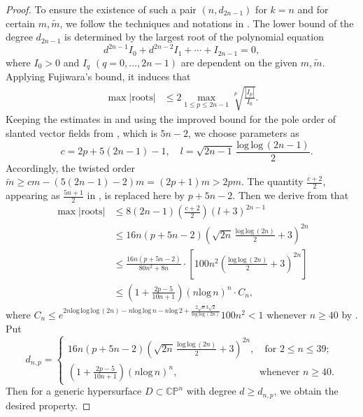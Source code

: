 \documentclass[english, 12pt]{amsart}
\def\log{\mathrm{log}\,}
\theoremstyle{plain}
\theoremstyle{remark}
\numberwithin{equation}{section}
\theoremstyle{plain}
\theoremstyle{named}
\begin{document}
\begin{proof}
	To ensure the existence of such a pair $(n, d_{2n-1})$ for $k=n$ and for certain $m,\widetilde{m}$, we follow the techniques and notations in \cite[Proposition 3.1 and pp. 43]{Merker-Ta22}. The lower bound of the degree $d_{2n-1}$ is determined by the largest root of the polynomial equation 
\[
	d^{2n-1}I_0+ d^{2n-2}I_1+\cdots+I_{2n-1}=0,
\]
where $I_0>0$ and $I_q$ $(q=0,\ldots,2n-1)$ are dependent on the given $m,\widetilde{m}$. Applying Fujiwara's bound, it induces that
	\begin{align*}
		\max|\text{roots}|&\leq  2\max\limits_{1\leq p\leq 2n-1}\sqrt[p]{\frac{|I_p|}{I_0}}.
	\end{align*}
	Keeping the estimates in \cite[pp. 12]{Merker-Ta22} and using the improved bound for the pole order of slanted vector fields from \cite{Darondeau_vectorfield}, which is \( 5n-2 \), we choose parameters as
	\[
	\quad c = 2p + 5(2n-1) - 1, \quad l = \sqrt{2n-1}\, \frac{\log\log(2n-1)}{2}.
	\]
	Accordingly, the twisted order $\widetilde{m}\geq cm-(5(2n-1)-2)m=\left(2p+1\right){m}>2pm$. The quantity $\frac{c+2}{2}$, appearing as $\frac{5n +1}{2}$ in \cite{Darondeau2016, Merker-Ta22},  is replaced here by $p + 5n -2$. Then we derive from \cite[pp. 12 \& 43]{Merker-Ta22} that
	\begin{align*}
		\max|\text{roots}|&\leq 8(2n-1)\left(\frac{c+2}{2}\right)(l+3)^{2n-1}\\
		&\leq 16n(p + 5n -2)\left(\sqrt{2n}\, \frac{\log\log(2n)}{2}+3\right)^{2n}\\
		&\leq \frac{16n(p + 5n -2)}{80n^2+8n}\cdot \left[100n^2\left(\frac{\log\log(2n)}{2}+3\right)^{2n}\right]\\
		&\leq \left(1+\frac{2p-5}{10n+1}\right)\left(n\log n\right)^n \cdot C_n,
	\end{align*}
	where $C_n\le e^{2n \log \log \log (2n) - n \log \log n - n \log 2+\frac{2\sqrt{n}3\sqrt{2}}{\log \log (2n)}}  100n^2 <1$ whenever $n\geq 40$ by \cite[pp. 43]{Merker-Ta22}. Put
	\begin{equation*}
		d_{n,p}=
		\begin{cases}
			16n(p + 5n -2)\left(\sqrt{2n}\, \frac{\log\log(2n)}{2}+3\right)^{2n},\quad \text{for }2\leq n\leq 39;\\
			\left(1+\frac{2p-5}{10n+1}\right)\left(n\log n\right)^n,\qquad \qquad\qquad\qquad\,\,\text{whenever $n\geq 40$}.
		\end{cases}
	\end{equation*}
	Then for a generic hypersurface $D\subset\mathbb{CP}^n$ with degree $d\geq d_{n,p}$, we obtain the desired property.
	

\end{proof}
\end{document}
